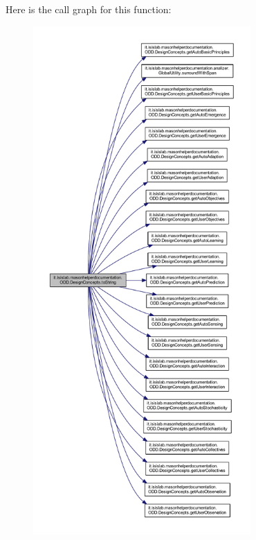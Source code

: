 Here is the call graph for this function\-:
\nopagebreak
\begin{figure}[H]
\begin{center}
\leavevmode
\includegraphics[height=550pt]{classit_1_1isislab_1_1masonhelperdocumentation_1_1_o_d_d_1_1_design_concepts_a77f77282f4f064e0bf3c80c6bf47c7ce_cgraph}
\end{center}
\end{figure}




